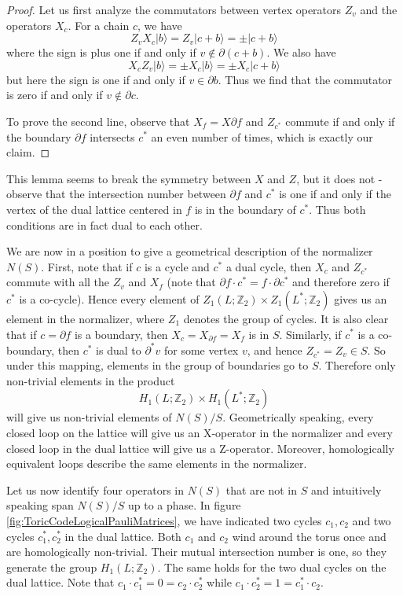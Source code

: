 \documentclass[a4paper, draft]{article}
\theoremstyle{own}
\theoremstyle{remark}
\newcommand{\Z}{\mathbb{Z}}
\begin{document}
\begin{proof}
Let us first analyze the commutators between vertex operators $Z_v$ and the operators $X_c$. For a chain $c$, we have
$$
Z_v X_c |b \rangle = Z_v |c + b \rangle = \pm | c + b \rangle 
$$ 
where the sign is plus one if and only if $v \notin \partial (c + b)$. We also have
$$
X_c Z_v |b \rangle = \pm X_c |b \rangle  = \pm X_c |c + b \rangle 
$$
but here the sign is one if and only if $v \in \partial b$. Thus we find that the commutator is zero if and only if $v \notin \partial c$. 

To prove the second line, observe that $X_f = X{\partial f}$ and $Z_{c^*}$ commute if and only if the boundary $\partial f$ intersects $c^*$ an even number of times, which is exactly our claim.
\end{proof} 

This lemma seems to break the symmetry between $X$ and $Z$, but it does not - observe that the intersection number between $\partial f$ and $c^*$ is one if and only if the vertex of the dual lattice centered in $f$ is in the boundary of $c^*$. Thus both conditions are in fact dual to each other.

We are now in a position to give a geometrical description of the normalizer $N(S)$. First, note that if $c$ is a cycle and $c^*$ a dual cycle, then $X_c$ and $Z_{c^*}$ commute with all the $Z_v$ and $X_f$ (note that $\partial f \cdot c^* = f \cdot \partial c^*$ and therefore zero if $c^*$ is a co-cycle). Hence every element of $Z_1(L;\Z_2) \times Z_1(L^*;\Z_2)$ gives us an element in the normalizer, where $Z_1$ denotes the group of cycles. It is also clear that if $c = \partial f$ is a boundary, then $X_c = X_{\partial f} = X_f$ is in $S$. Similarly, if $c^*$ is a co-boundary, then $c^*$ is dual to $\partial^* v$ for some vertex $v$, and hence $Z_{c^*} = Z_v \in S$. So under this mapping, elements in the group of boundaries go to $S$. Therefore only non-trivial elements in the product
$$
H_1(L;\Z_2) \times H_1(L^*;\Z_2) 
$$
will give us non-trivial elements of $N(S) / S$. Geometrically speaking, every closed loop on the lattice will give us an X-operator in the normalizer and every closed loop in the dual lattice will give us a Z-operator. Moreover, homologically equivalent loops describe the same elements in the normalizer. 


Let us now identify four operators in $N(S)$ that are not in $S$ and intuitively speaking span $N(S) / S$ up to a phase. In figure \ref{fig:ToricCodeLogicalPauliMatrices}, we have indicated two cycles $c_1, c_2$ and two cycles $c^*_1, c^*_2$ in the dual lattice. Both $c_1$ and $c_2$ wind around the torus once and are homologically non-trivial. Their mutual intersection number is one, so they generate the group $H_1(L;\Z_2)$. The same holds for the two dual cycles on the dual lattice. Note that $c_1 \cdot c_1^* = 0 = c_2 \cdot c_2^*$ while $c_1 \cdot c_2^* = 1 = c_1^* \cdot c_2$. 
\end{document}
